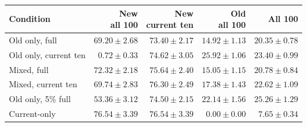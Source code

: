 \begin{tabular}{lrrrr}
\toprule
Condition & \shortstack{New\\all 100} & \shortstack{New\\current ten} & \shortstack{Old\\all 100} & All 100\\
\midrule
Old only, full & $69.20\pm2.68$ & $73.40\pm2.17$ & $14.92\pm1.13$ & $20.35\pm0.78$\\
Old only, current ten & $0.72\pm0.33$ & $74.62\pm3.05$ & $25.92\pm1.06$ & $23.40\pm0.99$\\
Mixed, full & $72.32\pm2.18$ & $75.64\pm2.40$ & $15.05\pm1.15$ & $20.78\pm0.84$\\
Mixed, current ten & $69.74\pm2.83$ & $76.30\pm2.49$ & $17.38\pm1.43$ & $22.62\pm1.09$\\
Old only, 5\% full & $53.36\pm3.12$ & $74.50\pm2.15$ & $22.14\pm1.56$ & $25.26\pm1.29$\\
Current-only & $76.54\pm3.39$ & $76.54\pm3.39$ & $0.00\pm0.00$ & $7.65\pm0.34$\\
\bottomrule
\end{tabular}
